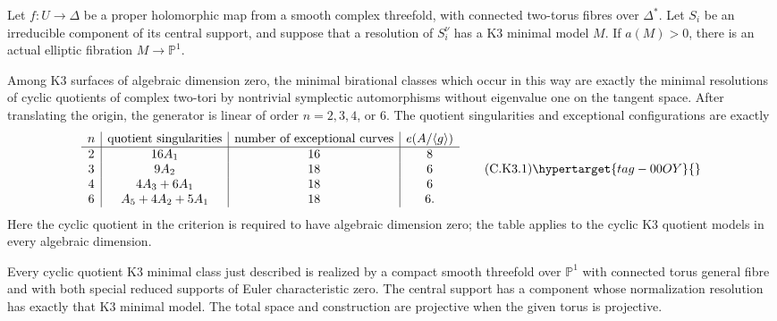 \begin{proposition}\hypertarget{tag-01D2}{}\label{cdp:st:C.2.UN.24}


Let $f:U\to\Delta$ be a proper holomorphic map from a
smooth complex threefold, with connected two-torus fibres
over $\Delta^*$. Let $S_i$ be an irreducible component of
its central support, and suppose that a resolution of
$S_i^\nu$ has a K3 minimal model $M$.
If $a(M)>0$, there is an actual elliptic fibration
$M\to\mathbb P^1$.

Among K3 surfaces of algebraic dimension zero, the minimal
birational classes which occur in this way are exactly the
minimal resolutions of cyclic quotients of complex two-tori
by nontrivial symplectic automorphisms without eigenvalue
one on the tangent space. After translating the origin, the generator
is linear of order $n=2,3,4$, or $6$. The quotient singularities
and exceptional configurations are exactly
\[
\begin{array}{c|c|c|c}
n&\text{quotient singularities}&
 \text{number of exceptional curves}&e(A/\langle g\rangle)\\ \hline
2&16A_1&16&8\\
3&9A_2&18&6\\
4&4A_3+6A_1&18&6\\
6&A_5+4A_2+5A_1&18&6.
\end{array}                                                    \tag{C.K3.1}\hypertarget{tag-00OY}{}\label{cdp:eq:C.K3.1}
\]
Here the cyclic quotient in the criterion is required to
have algebraic dimension zero; the table applies to the
cyclic K3 quotient models in every algebraic dimension.

Every cyclic quotient K3 minimal class just described is
realized by a compact smooth threefold over $\mathbb P^1$
with connected torus general fibre and with both special
reduced supports of Euler characteristic zero. The central
support has a component whose normalization resolution has
exactly that K3 minimal model. The total space and construction
are projective when the given torus is projective.
\end{proposition}
